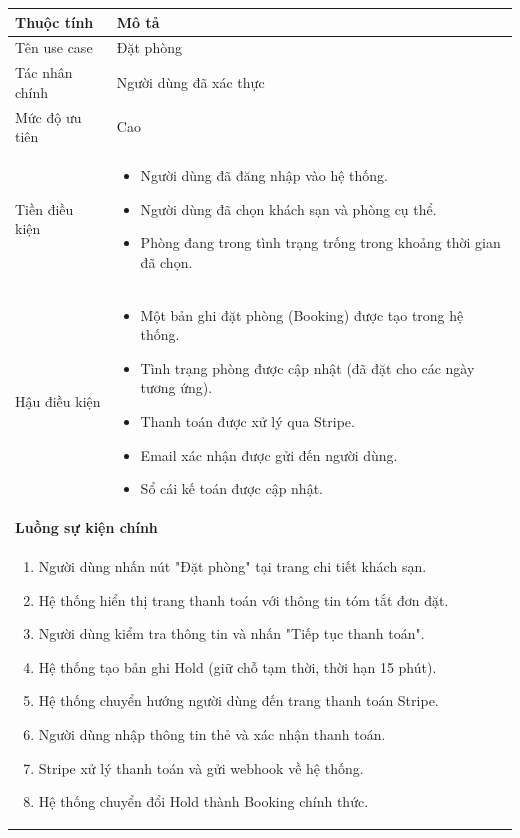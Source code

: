 \documentclass[13pt,a4paper,twoside]{report}
\begin{document}
\begin{longtable}{p{3.5cm} p{11.5cm}}
  \toprule
  \textbf{Thuộc tính} & \textbf{Mô tả} \\
  \midrule
  Tên use case & Đặt phòng \\
  Tác nhân chính & Người dùng đã xác thực \\
  Mức độ ưu tiên & Cao \\
  \midrule
  Tiền điều kiện &
  \begin{itemize}[nosep]
    \item Người dùng đã đăng nhập vào hệ thống.
    \item Người dùng đã chọn khách sạn và phòng cụ thể.
    \item Phòng đang trong tình trạng trống trong khoảng thời gian đã chọn.
  \end{itemize} \\
  \midrule
  Hậu điều kiện &
  \begin{itemize}[nosep]
    \item Một bản ghi đặt phòng (Booking) được tạo trong hệ thống.
    \item Tình trạng phòng được cập nhật (đã đặt cho các ngày tương ứng).
    \item Thanh toán được xử lý qua Stripe.
    \item Email xác nhận được gửi đến người dùng.
    \item Sổ cái kế toán được cập nhật.
  \end{itemize} \\
  \midrule
  \multicolumn{2}{p{15cm}}{\textbf{Luồng sự kiện chính}} \\
  \midrule
  \multicolumn{2}{p{15cm}}{%
    \begin{enumerate}[nosep]
      \item Người dùng nhấn nút "Đặt phòng" tại trang chi tiết khách sạn.
      \item Hệ thống hiển thị trang thanh toán với thông tin tóm tắt đơn đặt.
      \item Người dùng kiểm tra thông tin và nhấn "Tiếp tục thanh toán".
      \item Hệ thống tạo bản ghi Hold (giữ chỗ tạm thời, thời hạn 15 phút).
      \item Hệ thống chuyển hướng người dùng đến trang thanh toán Stripe.
      \item Người dùng nhập thông tin thẻ và xác nhận thanh toán.
      \item Stripe xử lý thanh toán và gửi webhook về hệ thống.
      \item Hệ thống chuyển đổi Hold thành Booking chính thức.

\end{enumerate}}
\end{longtable}
\end{document}
